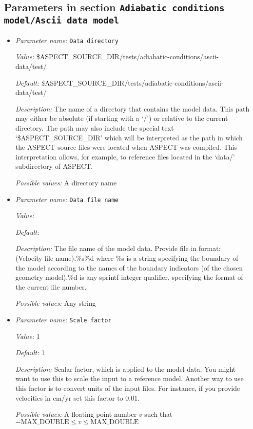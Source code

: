 \subsection{Parameters in section \tt Adiabatic conditions model/Ascii data model}
\label{parameters:Adiabatic_20conditions_20model/Ascii_20data_20model}

\begin{itemize}
\item {\it Parameter name:} {\tt Data directory}
\label{parameters:Adiabatic conditions model/Ascii data model/Data directory}


{\it Value:} \$ASPECT\_SOURCE\_DIR/tests/adiabatic-conditions/ascii-data/test/


{\it Default:} \$ASPECT\_SOURCE\_DIR/tests/adiabatic-conditions/ascii-data/test/


{\it Description:} The name of a directory that contains the model data. This path may either be absolute (if starting with a `/') or relative to the current directory. The path may also include the special text `\$ASPECT\_SOURCE\_DIR' which will be interpreted as the path in which the ASPECT source files were located when ASPECT was compiled. This interpretation allows, for example, to reference files located in the `data/' subdirectory of ASPECT. 


{\it Possible values:} A directory name
\item {\it Parameter name:} {\tt Data file name}
\label{parameters:Adiabatic conditions model/Ascii data model/Data file name}


{\it Value:} 


{\it Default:} 


{\it Description:} The file name of the model data. Provide file in format: (Velocity file name).\%s\%d where \%s is a string specifying the boundary of the model according to the names of the boundary indicators (of the chosen geometry model).\%d is any sprintf integer qualifier, specifying the format of the current file number. 


{\it Possible values:} Any string
\item {\it Parameter name:} {\tt Scale factor}
\label{parameters:Adiabatic conditions model/Ascii data model/Scale factor}


{\it Value:} 1


{\it Default:} 1


{\it Description:} Scalar factor, which is applied to the model data. You might want to use this to scale the input to a reference model. Another way to use this factor is to convert units of the input files. For instance, if you provide velocities in cm/yr set this factor to 0.01.


{\it Possible values:} A floating point number $v$ such that $-\text{MAX\_DOUBLE} \leq v \leq \text{MAX\_DOUBLE}$
\end{itemize}

